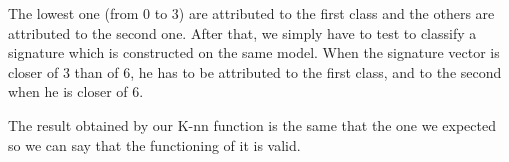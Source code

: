\documentclass[12pt]{article}
\begin{document}
The lowest one (from 0 to 3) are attributed to the first class and the others are attributed to the second one.
After that, we simply have to test to classify a signature which is constructed on the same model. When the signature vector is closer of 3 than of 6, he has to be attributed to the first class, and to the second when he is closer of 6.

The result obtained by our K-nn function is the same that the one we expected so we can say that the functioning of it is valid. 

\end{document}
